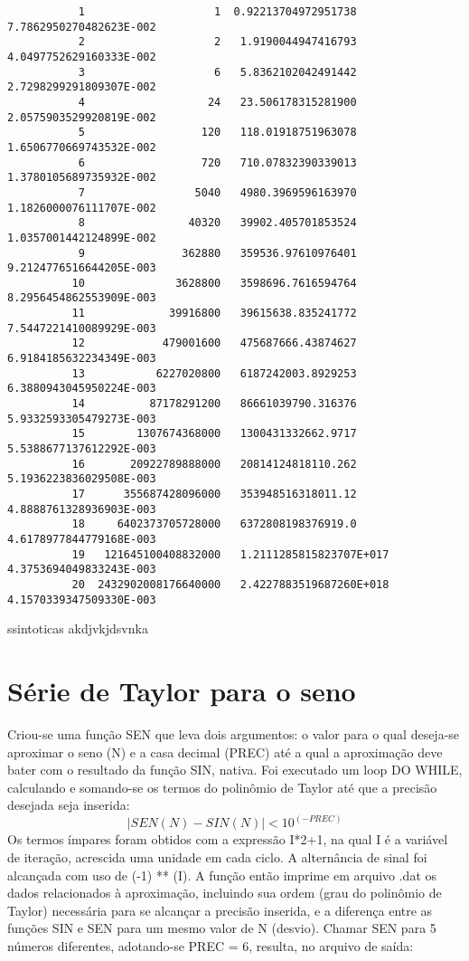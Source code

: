 \documentclass{article}
\begin{document}
\begin{lstlisting}
           1                    1  0.92213704972951738        7.7862950270482623E-002
           2                    2   1.9190044947416793        4.0497752629160333E-002
           3                    6   5.8362102042491442        2.7298299291809307E-002
           4                   24   23.506178315281900        2.0575903529920819E-002
           5                  120   118.01918751963078        1.6506770669743532E-002
           6                  720   710.07832390339013        1.3780105689735932E-002
           7                 5040   4980.3969596163970        1.1826000076111707E-002
           8                40320   39902.405701853524        1.0357001442124899E-002
           9               362880   359536.97610976401        9.2124776516644205E-003
          10              3628800   3598696.7616594764        8.2956454862553909E-003
          11             39916800   39615638.835241772        7.5447221410089929E-003
          12            479001600   475687666.43874627        6.9184185632234349E-003
          13           6227020800   6187242003.8929253        6.3880943045950224E-003
          14          87178291200   86661039790.316376        5.9332593305479273E-003
          15        1307674368000   1300431332662.9717        5.5388677137612292E-003
          16       20922789888000   20814124818110.262        5.1936223836029508E-003
          17      355687428096000   353948516318011.12        4.8888761328936903E-003
          18     6402373705728000   6372808198376919.0        4.6178977844779168E-003
          19   121645100408832000   1.2111285815823707E+017   4.3753694049833243E-003
          20  2432902008176640000   2.4227883519687260E+018   4.1570339347509330E-003
\end{lstlisting}
ssintoticas akdjvkjdsvnka
\section{Série de Taylor para o seno}

Criou-se uma função SEN que leva dois argumentos: o valor para o qual deseja-se aproximar o seno (N) e a casa decimal (PREC) até a qual a aproximação deve bater com o resultado da função SIN, nativa.
Foi executado um loop DO WHILE, calculando e somando-se os termos do polinômio de Taylor até que a precisão desejada seja inserida:
\[|SEN(N) - SIN(N)| < 10^{(-PREC)}\]
Os termos ímpares foram obtidos com a expressão I*2+1, na qual I é a variável de iteração, acrescida uma unidade em cada ciclo. A alternância de sinal foi alcançada com uso de (-1) ** (I).
A função então imprime em arquivo .dat os dados relacionados à aproximação, incluindo sua ordem (grau do polinômio de Taylor) necessária para se alcançar a precisão inserida, e a diferença entre as funções SIN e SEN para um mesmo valor de N (desvio). Chamar SEN para 5 números diferentes, adotando-se PREC = 6, resulta, no arquivo de saída:
\end{document}
